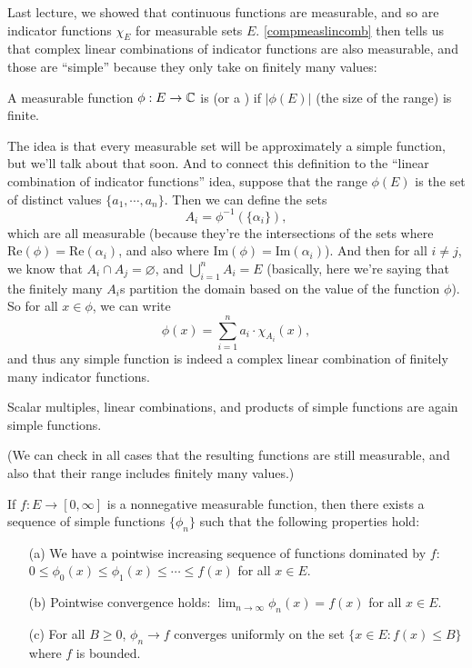 Last lecture, we showed that continuous functions are measurable, and so are indicator functions $\chi_E$ for measurable sets $E$. \cref{compmeaslincomb} then tells us that complex linear combinations of indicator functions are also measurable, and those are ``simple'' because they only take on finitely many values:

\begin{definition}
A measurable function $\phi: E \to \mathbb C$ is  (or a ) if $|\phi(E)|$ (the size of the range) is finite.
\end{definition}

The idea is that every measurable set will be approximately a simple function, but we'll talk about that soon. And to connect this definition to the ``linear combination of indicator functions'' idea, suppose that the range $\phi(E)$ is the set of distinct values $\{a_1, \cdots, a_n\}$. Then we can define the sets 
\[
    A_i = \phi^{-1}\left(\{\alpha_i\}\right), 
\]
which are all measurable (because they're the intersections of the sets where $\text{Re}(\phi) = \text{Re}(\alpha_i)$, and also where $\text{Im}(\phi) = \text{Im}(\alpha_i)$). And then for all $i \ne j$, we know that $A_i \cap A_j = \varnothing$, and $\bigcup_{i=1}^n A_i = E$ (basically, here we're saying that the finitely many $A_i$s partition the domain based on the value of the function $\phi$). So for all $x \in \phi$, we can write
\[
    \phi(x) = \sum_{i=1}^n a_i \cdot \chi_{A_i}(x),
\]
and thus any simple function is indeed a complex linear combination of finitely many indicator functions.

\begin{proposition}
Scalar multiples, linear combinations, and products of simple functions are again simple functions.
\end{proposition}

(We can check in all cases that the resulting functions are still measurable, and also that their range includes finitely many values.)

\begin{theorem}\label{meassimpleapprox}
If $f: E \to [0, \infty]$ is a nonnegative measurable function, then there exists a sequence of simple functions $\{\phi_n\}$ such that the following properties hold:
\begin{itemize}
\item[(a)] We have a pointwise increasing sequence of functions dominated by $f$: $0 \le \phi_0(x) \le \phi_1(x) \le \cdots \le f(x)$ for all $x \in E$.
\item[(b)] Pointwise convergence holds: $\lim_{n \to \infty} \phi_n(x) = f(x)$ for all $x \in E$.
\item[(c)] For all $B \ge 0$, $\phi_n \to f$ converges uniformly on the set $\{x \in E: f(x) \le B\}$ where $f$ is bounded.
\end{itemize}
\end{theorem}

